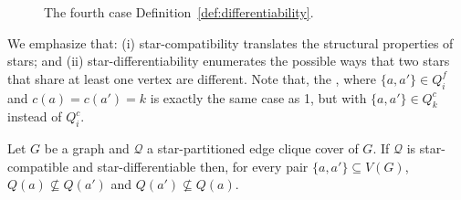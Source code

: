 \begin{figure}[!htb]
    
    
    
    \caption{The fourth case 
    Definition~\ref{def:differentiability}.}
    \label{fig:diff_cases2}
\end{figure}



We emphasize that: (i) star-compatibility translates the structural properties of stars; and (ii) star-differentiability enumerates the possible ways that two stars that share at least one vertex are different.
Note that, the , where $\{a,a'\} \in Q_i^f$ and $c(a) = c(a') = k$ is exactly the same case as 1, but with $\{a,a'\} \in Q_k^c$ instead of $Q_i^c$.

\begin{lemma}
    \label{lem:star_maximality}
    Let $G$ be a graph and $\mathcal{Q}$ a star-partitioned edge clique cover of $G$. If $\mathcal{Q}$ is star-compatible and star-differentiable then, for every pair $\{a, a'\} \subseteq V(G)$, $Q(a) \nsubseteq Q(a')$ and $Q(a') \nsubseteq Q(a)$.
\end{lemma}

